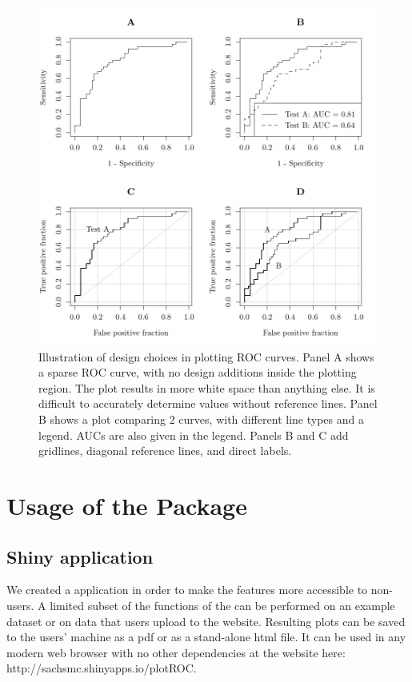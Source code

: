 \documentclass[article]{jss}
\begin{document}
\begin{figure}[htbp]
\centering
\includegraphics{figure/figure1-1.pdf}
\caption{Illustration of design choices in plotting ROC curves. Panel A
shows a sparse ROC curve, with no design additions inside the plotting
region. The plot results in more white space than anything else. It is
difficult to accurately determine values without reference lines. Panel
B shows a plot comparing 2 curves, with different line types and a
legend. AUCs are also given in the legend. Panels B and C add gridlines,
diagonal reference lines, and direct labels. \label{figure1}}
\end{figure}

\section{Usage of the Package}\label{usage-of-the-package}

\subsection{Shiny application}\label{shiny-application}

We created a  application \citep{shiny} in order to make the
features more accessible to non- users. A limited subset of
the functions of the  can be performed on an example
dataset or on data that users upload to the website. Resulting plots can
be saved to the users' machine as a pdf or as a stand-alone html file.
It can be used in any modern web browser with no other dependencies at
the website here: http://sachsmc.shinyapps.io/plotROC.
\end{document}
